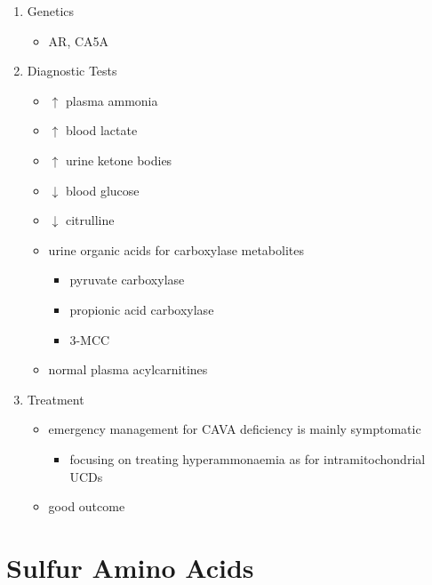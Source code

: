 \documentclass{scrartcl}
\begin{document}
\begin{enumerate}
\item Genetics
\label{sec:org5433057}
\begin{itemize}
\item AR, CA5A
\end{itemize}

\item Diagnostic Tests
\label{sec:orgf9dd99a}
\begin{itemize}
\item \(\uparrow\) plasma ammonia
\item \(\uparrow\) blood lactate
\item \(\uparrow\) urine ketone bodies
\item \(\downarrow\) blood glucose
\item \(\downarrow\) citrulline
\item urine organic acids for carboxylase metabolites
\begin{itemize}
\item pyruvate carboxylase
\item propionic acid carboxylase
\item 3-MCC
\end{itemize}
\item normal plasma acylcarnitines
\end{itemize}

\item Treatment
\label{sec:org6a23f93}
\begin{itemize}
\item emergency management for CAVA deficiency is mainly symptomatic
\begin{itemize}
\item focusing on treating hyperammonaemia as for intramitochondrial UCDs
\end{itemize}
\item good outcome
\end{itemize}
\end{enumerate}

\section{Sulfur Amino Acids}
\label{sec:org9579601}
\end{document}
